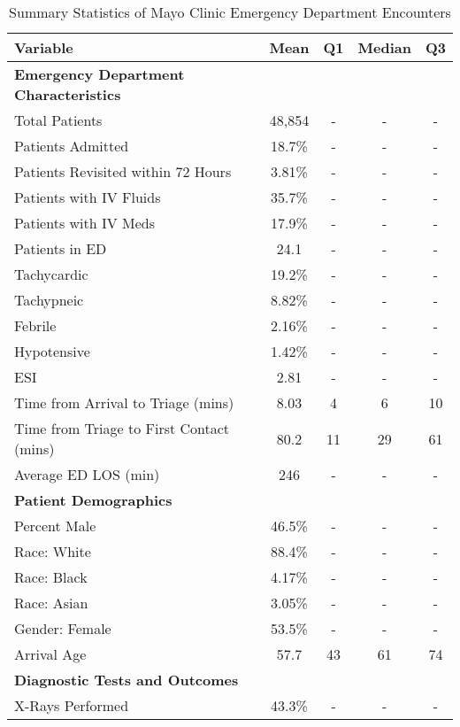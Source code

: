 \documentclass[,mnsc,nonblindrev]{informs}
\begin{document}
\begin{table}[ht]
\centering
\caption{Summary Statistics of Mayo Clinic Emergency Department Encounters}
\label{tab:summary_stats}
\begin{threeparttable}
\begin{tabular}{lccccc}
\toprule
Variable &  & {Mean} & {Q1} & {Median} & {Q3} \\
\midrule
\textbf{Emergency Department Characteristics} & & & & & \\
Total Patients & & {48,854} & {-} & {-} & {-} \\
Patients Admitted & & {18.7\%} & {-} & {-} & {-} \\
Patients Revisited within 72 Hours & & {3.81\%} & {-} & {-} & {-} \\
Patients with IV Fluids & & {35.7\%} & {-} & {-} & {-} \\
Patients with IV Meds & & {17.9\%} & {-} & {-} & {-} \\
Patients in ED & & {24.1} & {-} & {-} & {-} \\
Tachycardic & & {19.2\%} & {-} & {-} & {-} \\
Tachypneic & & {8.82\%} & {-} & {-} & {-} \\
Febrile & & {2.16\%} & {-} & {-} & {-} \\
Hypotensive & & {1.42\%} & {-} & {-} & {-} \\
ESI & & {2.81} & {-} & {-} & {-} \\
Time from Arrival to Triage (mins) & & {8.03} & {4} & {6} & {10} \\
Time from Triage to First Contact (mins) & & {80.2} & {11} & {29} & {61} \\
Average ED LOS (min) & & {246} & {-} & {-} & {-} \\
\midrule
\textbf{Patient Demographics} & & & & & \\
Percent Male & & {46.5\%} & {-} & {-} & {-} \\
Race: White & & {88.4\%} & {-} & {-} & {-} \\
Race: Black & & {4.17\%} & {-} & {-} & {-} \\
Race: Asian & & {3.05\%} & {-} & {-} & {-} \\
Gender: Female & & {53.5\%} & {-} & {-} & {-} \\
Arrival Age & & {57.7} & {43} & {61} & {74} \\
\midrule
\textbf{Diagnostic Tests and Outcomes} & & & & & \\
X-Rays Performed & & {43.3\%} & {-} & {-} & {-} \\

\end{tabular}
\end{threeparttable}
\end{table}
\end{document}
